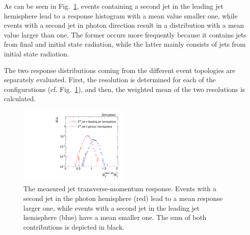 As can be seen in Fig.~\ref{fig:fullResponseAndContributions}, events containing a second jet in the leading jet hemisphere lead to a response histogram with a mean value smaller one, while events with a second jet in photon direction result in a distribution with a mean value larger than one. 
The former occurs more frequently because it contains jets from final and initial state radiation, while the latter mainly consists of jets from initial state radiation.

The two response distributions coming from the different event topologies are separately evaluated. 
First, the resolution is determined for each of the configurations (cf. Fig.~\ref{fig:fullResponseAndContributions}), and then, the weighted mean of the two resolutions is calculated.\\
\begin{figure}[!t]
  \centering
      \includegraphics[width=0.49\textwidth]{figures/resolution/methodology/fullResponseAndContributions_6_alpha_bin.pdf}
  \caption{The measured jet transverse-momentum response. Events with a second jet in the photon hemisphere (red) lead to a mean response larger one, while events with a second jet in the leading jet hemisphere (blue) have a mean smaller one. The sum of both contributions is depicted in black.}  
  \label{fig:fullResponseAndContributions}
\end{figure}



